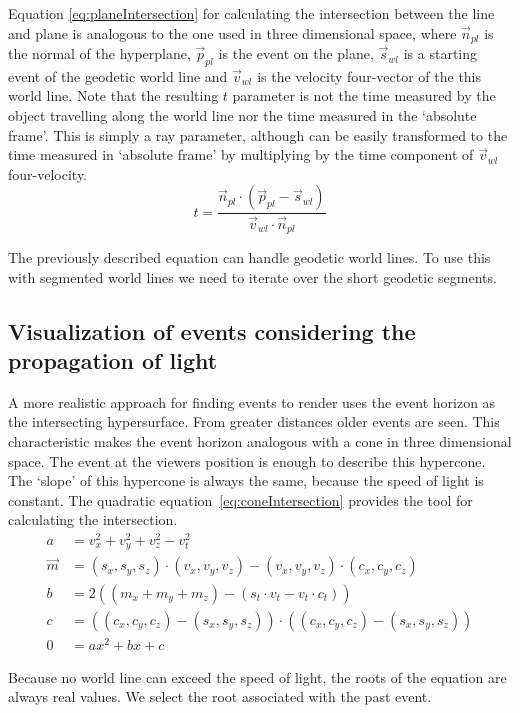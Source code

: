 \documentclass{egpubl}
\begin{document}
Equation \ref{eq:planeIntersection} for calculating the intersection between the line and plane is analogous to the one used in three dimensional space, where $\vec{n}_{pl}$ is the normal of the hyperplane, $\vec{p}_{pl}$ is the event on the plane, $\vec{s}_{wl}$ is a starting event of the geodetic world line and $\vec{v}_{wl}$ is the velocity four-vector of the this world line. Note that the resulting $t$ parameter is not the time measured by the object travelling along the world line nor the time measured in the `absolute frame'. This is simply a ray parameter, although can be easily transformed to the time measured in `absolute frame' by multiplying by the time component of $\vec{v}_{wl}$ four-velocity.
\begin{equation}
\label{eq:planeIntersection}
t = \frac{\vec{n}_{pl}\cdot(\vec{p}_{pl} - \vec{s}_{wl})}{\vec{v}_{wl}\cdot\vec{n}_{pl}}
\end{equation}

The previously described equation can handle geodetic world lines. To use this with segmented world lines we need to iterate over the short geodetic segments. 

\subsection{Visualization of events considering the propagation of light}
\label{visConsLight}
A more realistic approach for finding events to render uses the event horizon as the intersecting hypersurface. From greater distances older events are seen. This characteristic makes the event horizon analogous with a cone in three dimensional space. The event at the viewers position is enough to describe this hypercone. The `slope' of this hypercone is always the same, because the speed of light is constant. The quadratic equation~\ref{eq:coneIntersection} provides the tool for calculating the intersection.
\begin{align}
a &= v_x^2 + v_y^2 + v_z^2 - v_t^2\\
\vec{m} &= (s_x, s_y, s_z)\cdot{}(v_x, v_y, v_z) - (v_x, v_y, v_z)\cdot{}(c_x, c_y, c_z)\\
b &= 2((m_x + m_y + m_z) - (s_t\cdot{}v_t - v_t\cdot{}c_t))\\
c &= ((c_x, c_y, c_z) - (s_x, s_y, s_z))\cdot{}((c_x, c_y, c_z) - (s_x, s_y, s_z))\\
0 &=ax^2 + bx + c
\label{eq:coneIntersection}
\end{align}

Because no world line can exceed the speed of light, the roots of the equation are always real values. We select the root associated with the past event. 
\end{document}
